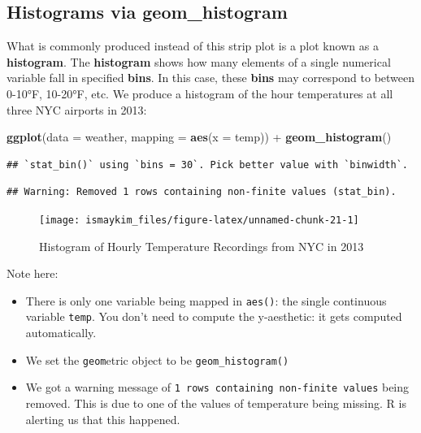 \documentclass[]{tufte-book}
\newenvironment{Shaded}{\begin{snugshade}}{\end{snugshade}}
\newcommand{\KeywordTok}[1]{\textcolor[rgb]{0.13,0.29,0.53}{\textbf{{#1}}}}
\newcommand{\DataTypeTok}[1]{\textcolor[rgb]{0.13,0.29,0.53}{{#1}}}
\newcommand{\StringTok}[1]{\textcolor[rgb]{0.31,0.60,0.02}{{#1}}}
\newcommand{\NormalTok}[1]{{#1}}
\providecommand{\tightlist}{%
  \setlength{\itemsep}{0pt}\setlength{\parskip}{0pt}}
\begin{document}
\subsection{Histograms via geom\_histogram}\label{geomhistogram}

What is commonly produced instead of this strip plot is a plot known as
a \textbf{histogram}. The \textbf{histogram} shows how many elements of
a single numerical variable fall in specified \textbf{bins}. In this
case, these \textbf{bins} may correspond to between 0-10°F, 10-20°F,
etc. We produce a histogram of the hour temperatures at all three NYC
airports in 2013:

\begin{Shaded}
\begin{Highlighting}[]
\KeywordTok{ggplot}\NormalTok{(}\DataTypeTok{data =} \NormalTok{weather, }\DataTypeTok{mapping =} \KeywordTok{aes}\NormalTok{(}\DataTypeTok{x =} \NormalTok{temp)) +}
\StringTok{  }\KeywordTok{geom_histogram}\NormalTok{()}
\end{Highlighting}
\end{Shaded}

\begin{verbatim}
## `stat_bin()` using `bins = 30`. Pick better value with `binwidth`.
\end{verbatim}

\begin{verbatim}
## Warning: Removed 1 rows containing non-finite values (stat_bin).
\end{verbatim}

\begin{figure}

{\centering \texttt{[image: ismaykim\_files/figure-latex/unnamed-chunk-21-1]} 

}

\caption[Histogram of Hourly Temperature Recordings from NYC in 2013]{Histogram of Hourly Temperature Recordings from NYC in 2013}\label{fig:unnamed-chunk-21}
\end{figure}

Note here:

\begin{itemize}
\tightlist
\item
  There is only one variable being mapped in \texttt{aes()}: the single
  continuous variable \texttt{temp}. You don't need to compute the
  y-aesthetic: it gets computed automatically.
\item
  We set the \texttt{geom}etric object to be \texttt{geom\_histogram()}
\item
  We got a warning message of
  \texttt{1\ rows\ containing\ non-finite\ values} being removed. This
  is due to one of the values of temperature being missing. R is
  alerting us that this happened.
\end{itemize}
\end{document}

